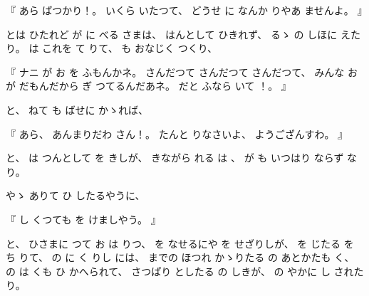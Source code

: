 
%
『
あら
ばつかり！。
%
いくら
いたつて、
%
どうせ
に
なんか
りやあ
ませんよ。
』

%
とは
ひたれど
が%
に
べる
さまは、
%
はんとして
ひきれず、
%
るゝ
の
しほに
えたり。
%
は
これを
て
りて、
%
も
おなじく
つくり、

%
『
ナニ
が
お
を
ふもんかネ。
%
さんだつて
さんだつて
さんだつて、
%
みんな
お
が
だもんだから
ぎ
つてるんだあネ。
%
だと
ふなら
いて
！。
』

%
と、
%
ねて
も
ばせに
かゝれば、

%
『
あら、
%
あんまりだわ
さん！。
%
たんと
りなさいよ、
%
ようござんすわ。
』

%
と、
%
は
つんとして
を
きしが、
%
きながら
れる
は%
、
%
%
が
も
いつはり
ならず
なり。%

%
やゝ
ありて
ひ
したるやうに、

%
『
し
くつても
を
けましやう。
』

%
と、
%
ひさまに
つて
お
は
りつ、
%
を
なせるにや
%
を
せざりしが、
%
を
じたる
を
ち
りて、
%
の
に
く
りし
には、
%
までの
ほつれ
かゝりたる
の
あとかたも
く、
%
の
は
くも
ひ
かへられて、
%
さつぱり
としたる
の
しきが、
%
の
やかに
し
されたり。

